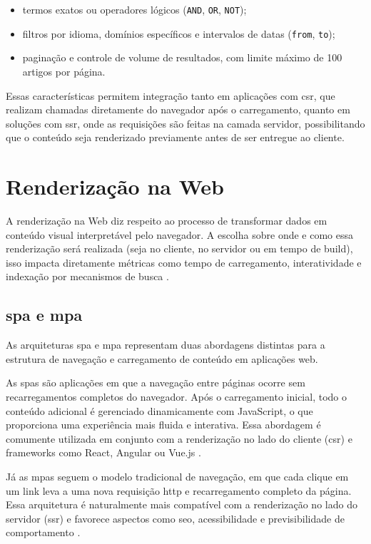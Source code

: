 \begin{itemize}
    \item termos exatos ou operadores lógicos (\texttt{AND}, \texttt{OR}, \texttt{NOT});
    \item filtros por idioma, domínios específicos e intervalos de datas (\texttt{from}, \texttt{to});
    \item paginação e controle de volume de resultados, com limite máximo de 100 artigos por página.
\end{itemize}

Essas características permitem integração tanto em aplicações com \acrshort{csr}, que realizam chamadas diretamente do navegador após o carregamento, quanto em soluções com \acrshort{ssr}, onde as requisições são feitas na camada servidor, possibilitando que o conteúdo seja renderizado previamente antes de ser entregue ao cliente.




\section{Renderização na Web}
\label{sec:renderizacao-web}

A renderização na Web diz respeito ao processo de transformar dados em conteúdo visual interpretável pelo navegador. A escolha sobre onde e como essa renderização será realizada (seja no cliente, no servidor ou em tempo de build), isso impacta diretamente métricas como tempo de carregamento, interatividade e indexação por mecanismos de busca \cite{osmani2025}.


\subsection{\acrfull{spa} e \acrfull{mpa}}
\label{subsec:spa-mpa}

As arquiteturas \acrfull{spa} e \acrfull{mpa} representam duas abordagens distintas para a estrutura de navegação e carregamento de conteúdo em aplicações web.

As \acrshort{spa}s são aplicações em que a navegação entre páginas ocorre sem recarregamentos completos do navegador. Após o carregamento inicial, todo o conteúdo adicional é gerenciado dinamicamente com JavaScript, o que proporciona uma experiência mais fluida e interativa. Essa abordagem é comumente utilizada em conjunto com a renderização no lado do cliente (\acrshort{csr}) e frameworks como React, Angular ou Vue.js \cite{atori2024}.

Já as \acrshort{mpa}s seguem o modelo tradicional de navegação, em que cada clique em um link leva a uma nova requisição \acrshort{http} e recarregamento completo da página. Essa arquitetura é naturalmente mais compatível com a renderização no lado do servidor (\acrshort{ssr}) e favorece aspectos como \acrshort{seo}, acessibilidade e previsibilidade de comportamento \cite{osmani2025}.

